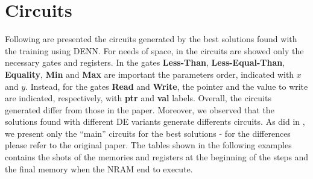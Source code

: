 \section{Circuits}\label{subsec:circuits}
Following are presented the circuits generated by the best solutions found with  the training using DENN. For needs of space, in the circuits are showed only the necessary gates and registers. In the gates \textbf{Less-Than}, \textbf{Less-Equal-Than}, \textbf{Equality}, \textbf{Min} and \textbf{Max} are important the parameters order, indicated with $x$ and $y$. Instead, for the gates \textbf{Read} and \textbf{Write}, the pointer and the value to write are indicated, respectively, with \textbf{ptr} and \textbf{val} labels.\newline\newline
Overall, the circuits generated differ from those in the paper. Moreover, we observed that the solutions found with different DE variants generate differents circuits. As did in \cite{NRAM:2016}, we present only the ``main'' circuits for the best solutions - for the differences please refer to the original paper. The tables shown in the following examples contains the shots of the memories and registers at the beginning of the steps and the final memory when the NRAM end to execute.
\clearpage
